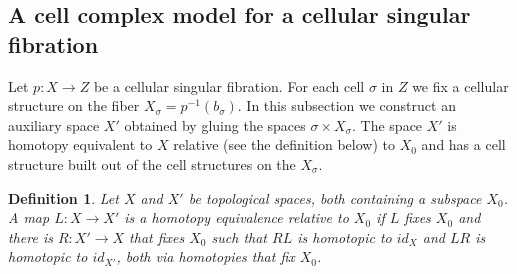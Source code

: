 \documentclass[11pt,letterpaper]{amsart}
\newtheorem*{defn}{Definition}
\newtheorem*{remark}{Remark}
\begin{document}


\subsection{A cell complex model for a cellular singular fibration}
Let $p:X\rightarrow Z$ be a cellular singular fibration. For each cell $\sigma$ in $Z$ we fix a cellular structure on the fiber $X_{\sigma}=p^{-1}(b_{\sigma})$. In this subsection we construct an auxiliary space $X'$ obtained by gluing the spaces $\sigma\times X_{\sigma}$. The space $X'$ is homotopy equivalent to $X$  
relative (see the definition below)
to $X_0$ and has a cell structure built out of the cell structures on the $X_{\sigma}$. 

\begin{defn}
Let $X$ and $X'$ be topological spaces, both containing a subspace $X_0$. A map $L:X\rightarrow X'$ is a homotopy equivalence relative to $X_0$ if $L$ fixes $X_0$ and there is $R:X'\rightarrow X$ that fixes $X_0$ such that $RL$ is homotopic to $id_X$ and $LR$ is homotopic to $id_{X'}$, both via homotopies that fix $X_0$.
\end{defn}
\end{document}
